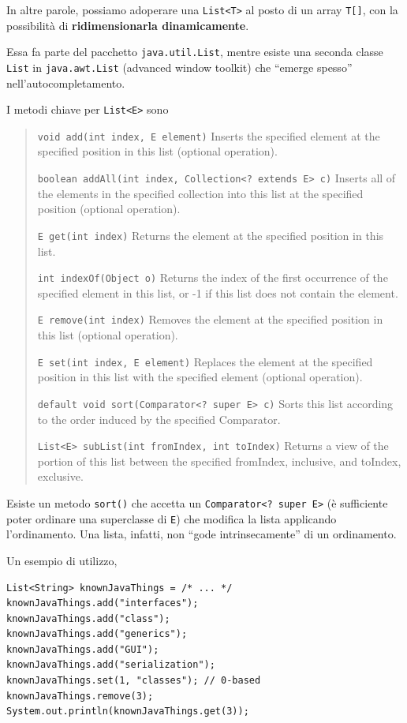 \documentclass[\fontsizeclass,twocolumn]{\classname}
\theoremstyle{definition}
\theoremstyle{definition}
\begin{document}
In altre parole, possiamo adoperare una \texttt{List<T>} al posto di un array
\texttt{T[]}, con la possibilità di \textbf{ridimensionarla dinamicamente}.

Essa fa parte del pacchetto \texttt{java.util.List}, mentre esiste una seconda
classe \texttt{List} in \texttt{java.awt.List} (advanced window toolkit) che
``emerge spesso'' nell'autocompletamento.

I metodi chiave per \texttt{List<E>} sono
\begin{quote}
    \footnotesize{\texttt{void 	add(int index, E element)} 	Inserts the specified element at the specified position in this list (optional operation).

\texttt{boolean 	addAll(int index, Collection<? extends E> c)} 	Inserts all of the elements in the specified collection into this list at the specified position (optional operation).

\texttt{E 	get(int index)} 	Returns the element at the specified position in this list.

\texttt{int 	indexOf(Object o)} 	Returns the index of the first occurrence of the specified element in this list, or -1 if this list does not contain the element.

\texttt{E 	remove(int index)} 	Removes the element at the specified position in this list (optional operation).

\texttt{E 	set(int index, E element)} 	Replaces the element at the specified position in this list with the specified element (optional operation).

\texttt{default void 	sort(Comparator<? super E> c)} 	Sorts this list according to the order induced by the specified Comparator.

\texttt{List<E> 	subList(int fromIndex, int toIndex)} 	Returns a view of the portion of this list between the specified fromIndex, inclusive, and toIndex, exclusive.}
\end{quote}

Esiste un metodo \texttt{sort()} che accetta un \texttt{Comparator<? super E>}
(è sufficiente poter ordinare una superclasse di \texttt{E}) che modifica la
lista applicando l'ordinamento. Una lista, infatti, non ``gode
intrinsecamente'' di un ordinamento.

Un esempio di utilizzo,

\begin{lstlisting}
List<String> knownJavaThings = /* ... */
knownJavaThings.add("interfaces");
knownJavaThings.add("class");
knownJavaThings.add("generics");
knownJavaThings.add("GUI");
knownJavaThings.add("serialization");
knownJavaThings.set(1, "classes"); // 0-based
knownJavaThings.remove(3);
System.out.println(knownJavaThings.get(3));
\end{lstlisting}
\end{document}
